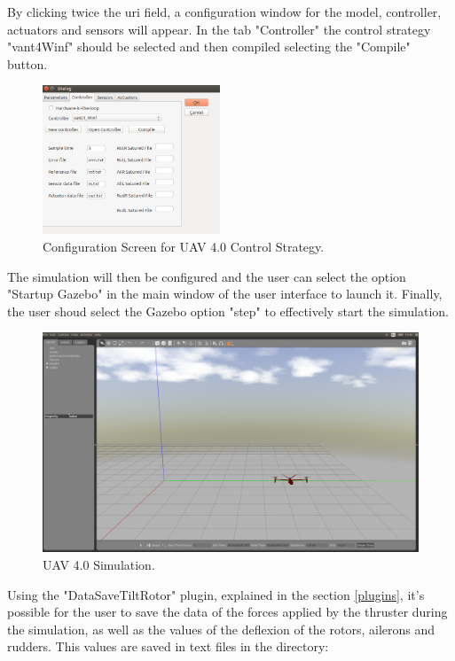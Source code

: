 By clicking twice the uri field, a configuration window for the model, controller, actuators and sensors will appear. In the tab "Controller" the control strategy "vant4Winf" should be selected and then compiled selecting the "Compile" button.


\begin{figure}[!ht]
	\centering
	\includegraphics[width=150pt]{figuras/v4controllersetup.png}
	\caption{Configuration Screen for UAV 4.0 Control Strategy.}
	\label{v4controllersetup}
\end{figure}

The simulation will then be configured and the user can select the option "Startup Gazebo" in the main window of the user interface to launch it. Finally, the user shoud select the Gazebo option "step" to effectively start the simulation.


\begin{figure}[!ht]
	\centering
	\includegraphics[width=350pt]{figuras/v4sim.png}
	\caption{UAV 4.0 Simulation.}
	\label{v4sim}
\end{figure}

Using the "DataSaveTiltRotor" plugin, explained in the section \ref{plugins}, it's possible for the user to save the data of the forces applied by the thruster during the simulation, as well as the values of the deflexion of the rotors, ailerons and rudders. This values are saved in text files in the directory:
	
